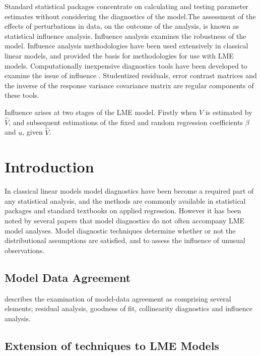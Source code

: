 \documentclass[12pt, a4paper]{article}
\begin{document}
	Standard statistical packages concentrate on calculating and testing parameter estimates without considering the diagnostics of the model.The assessment of the effects of perturbations in data, on the outcome of the analysis, is known as statistical influence analysis. Influence analysis examines the robustness of the model. Influence analysis methodologies have been used extensively in classical linear models, and provided the basis for methodologies for use with LME models.
	Computationally inexpensive diagnostics tools have been developed to examine the issue of influence \citep{Zewotir}.
	Studentized residuals, error contrast matrices and the inverse of the response variance covariance matrix are regular components of these tools.
	
	Influence arises at two stages of the LME model. Firstly when $V$ is estimated by $\hat{V}$, and subsequent
	estimations of the fixed and random regression coefficients $\beta$ and $u$, given $\hat{V}$.
	
	
	\section{Introduction}%
	In classical linear models model diagnostics have been become a required part of any statistical analysis, and the methods are commonly available in statistical packages and standard textbooks on applied regression. However it has been noted by several papers that model diagnostics do not often accompany LME model analyses.
	Model diagnostic techniques determine whether or not the distributional assumptions are satisfied, and to assess the influence of unusual observations.
	
	\subsection{Model Data Agreement} %
	\citet{schabenberger} describes the examination of model-data agreement as comprising several elements; residual analysis, goodness of fit, collinearity diagnostics and influence analysis.


\subsection{Extension of techniques to LME Models} %
\end{document}
